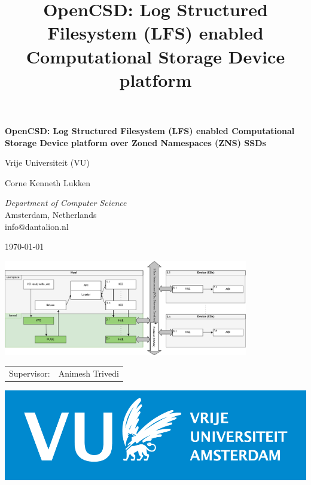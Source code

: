 \documentclass[conference]{IEEEtran}
\title{OpenCSD: Log Structured Filesystem (LFS) enabled Computational Storage Device platform%
}
\begin{document}
\begin{titlepage}
\begingroup
\centering
{\LARGE\bfseries OpenCSD: Log Structured Filesystem (LFS) enabled Computational Storage Device platform over Zoned Namespaces (ZNS) SSDs}

\vspace{1cm}

{\Large Vrije Universiteit (VU)}

\vspace{0.5cm}

{Corne Kenneth Lukken}

{\textit{Department of Computer Science} \\
Amsterdam, Netherlands \\
info@dantalion.nl}

\vspace{0.5cm}

\today

\vspace{4.0cm}

\includegraphics[width=0.8\textwidth]{resources/images/loader-pfs-arch-2.drawio.png}

\vfill
\endgroup
\begin{minipage}{0.4\textwidth}
	\begin{tabular}{ll}
		\Large Supervisor: & \Large Animesh Trivedi \\
	\end{tabular}
\end{minipage} \hfill
\begin{minipage}{0.3\textwidth}
	\begin{flushright}
	\includegraphics[width=\textwidth]{resources/images/vu-logo.png}
\end{flushright}
\end{minipage}
\end{titlepage}
\end{document}
